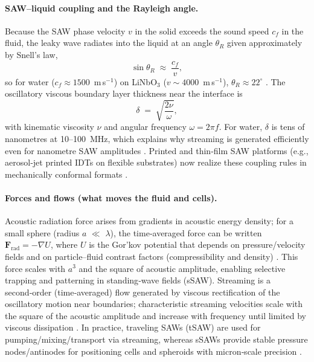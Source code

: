 \documentclass[referee,pdflatex, sn-vancouver-num]{sn-jnl}%
\theoremstyle{thmstyleone}%
\theoremstyle{thmstyletwo}%
\theoremstyle{thmstylethree}%
\begin{document}
\paragraph{SAW–liquid coupling and the Rayleigh angle.}
Because the SAW phase velocity \(v\) in the solid exceeds the sound speed \(c_f\) in the fluid, the leaky wave radiates into the liquid at an angle \(\theta_R\) given approximately by Snell’s law,
\[
\sin \theta_R \;\approx\; \frac{c_f}{v},
\]
so for water (\(c_f\!\approx\!1500\)~m\,s\(^{-1}\)) on LiNbO\(_3\) (\(v\!\sim\!4000\)~m\,s\(^{-1}\)), \(\theta_R\!\approx\!22^{\circ}\) \cite{Friend2011,Ding2013}. The oscillatory viscous boundary layer thickness near the interface is
\[
\delta \;=\; \sqrt{\frac{2\nu}{\omega}},
\]
with kinematic viscosity \(\nu\) and angular frequency \(\omega=2\pi f\). For water, \(\delta\) is tens of nanometres at 10–100~MHz, which explains why streaming is generated efficiently even for nanometre SAW amplitudes \cite{Friend2011,Yeo2014_SAWmicrofluidics}. Printed and thin‑film SAW platforms (e.g., aerosol‑jet printed IDTs on flexible substrates) now realize these coupling rules in mechanically conformal formats \cite{Rich2024_MicroNano}.

\paragraph{Forces and flows (what moves the fluid and cells).}
Acoustic radiation force arises from gradients in acoustic energy density; for a small sphere (radius \(a\) \(\ll\) \(\lambda\)), the time‑averaged force can be written \( \mathbf{F}_{\mathrm{rad}} = -\nabla U \), where \(U\) is the Gor’kov potential that depends on pressure/velocity fields and on particle–fluid contrast factors (compressibility and density) \cite{Friend2011,Gedge2012_SAW}. This force scales with \(a^{3}\) and the square of acoustic amplitude, enabling selective trapping and patterning in standing‑wave fields (sSAW). Streaming is a second‑order (time‑averaged) flow generated by viscous rectification of the oscillatory motion near boundaries; characteristic streaming velocities scale with the square of the acoustic amplitude and increase with frequency until limited by viscous dissipation \cite{Ding2013,Friend2011}. In practice, traveling SAWs (tSAW) are used for pumping/mixing/transport via streaming, whereas sSAWs provide stable pressure nodes/antinodes for positioning cells and spheroids with micron‑scale precision \cite{Gedge2012_SAW,rufo2022}.
\end{document}
